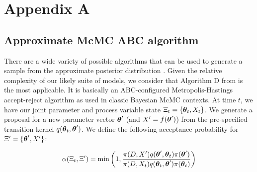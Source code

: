 \documentclass[11pt]{article}
\newcommand{\ds}{\displaystyle}
\newcommand{\xtheta}{\mbox{\boldmath$\theta$}}
\begin{document}
\clearpage
\section*{Appendix A}

\subsection*{Approximate McMC ABC algorithm}

There are a wide variety of possible algorithms that can be used to generate a sample from the approximate posterior distribution \cite{abc,synlkhd,abcmcmc}. Given the relative complexity of our likely suite of models, we consider that Algorithm D from \cite{abcmcmc} is the most applicable. It is basically an ABC-configured Metropolis-Hastings accept-reject algorithm as used in classic Bayesian McMC contexts. At time $t$, we have our joint parameter and process variable state $\Xi_t=\{\xtheta_t,X_t\}$. We generate a proposal for a new parameter vector $\xtheta^\prime$ (and $X^\prime=f(\xtheta^\prime)$) from the pre-specified transition kernel $q(\xtheta_t,\xtheta^\prime)$. We define the following acceptance probability for $\Xi^\prime=\{\xtheta^\prime,X^\prime\}$:

\begin{equation*}
    \ds \alpha(\Xi_t,\Xi^\prime)=\min\left(1,\frac{\pi(D,X^\prime)q(\xtheta^\prime,\xtheta_t)\pi(\xtheta^\prime)}{\pi(D,X_t)q(\xtheta_t,\xtheta^\prime)\pi(\xtheta_t)}\right)
\end{equation*}
\end{document}
